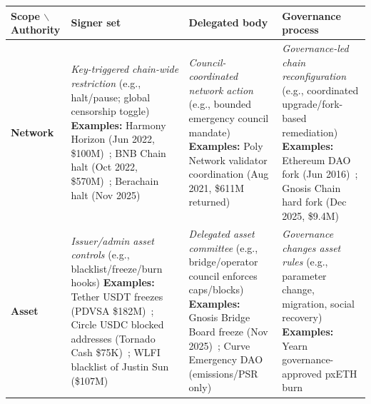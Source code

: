 \documentclass[12pt]{article}
\begin{document}
\begin{table}[!htbp]
\centering
\scriptsize
\setlength{\tabcolsep}{3pt}
\renewcommand{\arraystretch}{1.0}

\begin{tabularx}{\linewidth}{
  >{\raggedright\arraybackslash}p{2.0cm}
  >{\raggedright\arraybackslash}X
  >{\raggedright\arraybackslash}X
  >{\raggedright\arraybackslash}X
}
\toprule
\textbf{Scope $\backslash$ Authority} &
\textbf{Signer set} &
\textbf{Delegated body} &
\textbf{Governance process} \\
\midrule

\textbf{Network}
&
\emph{Key-triggered chain-wide restriction} \newline
(e.g., halt/pause; global censorship toggle) \newline
\textbf{Examples:} Harmony Horizon (Jun 2022, \$100M)~\cite{Harmony2022Exploit}; BNB Chain halt (Oct 2022, \$570M)~\cite{ReutersBNB2022}; Berachain halt (Nov 2025)~\cite{Berachain2025PostMortem}
&
\emph{Council-coordinated network action} \newline
(e.g., bounded emergency council mandate) \newline
\textbf{Examples:} Poly Network validator coordination (Aug 2021, \$611M returned)~\cite{PolyNetworkElliptic}
&
\emph{Governance-led chain reconfiguration} \newline
(e.g., coordinated upgrade/fork-based remediation) \newline
\textbf{Examples:} Ethereum DAO fork (Jun 2016)~\cite{TheDAO2016}; Gnosis Chain hard fork (Dec 2025, \$9.4M)~\cite{Gnosis2025HardFork} \\
\midrule

\textbf{Asset}
&
\emph{Issuer/admin asset controls} \newline
(e.g., blacklist/freeze/burn hooks) \newline
\textbf{Examples:} Tether USDT freezes (PDVSA \$182M)~\cite{TetherVenezuela2026}; Circle USDC blocked addresses (Tornado Cash \$75K)~\cite{CircleUSDCTerms2025}; WLFI blacklist of Justin Sun (\$107M)~\cite{WLFIJustinSun2025}
&
\emph{Delegated asset committee} \newline
(e.g., bridge/operator council enforces caps/blocks) \newline
\textbf{Examples:} Gnosis Bridge Board freeze (Nov 2025)~\cite{Gnosis2025BalancerHack}; Curve Emergency DAO (emissions/PSR only)~\cite{CurveExploitLlamaRisk}
&
\emph{Governance changes asset rules} \newline
(e.g., parameter change, migration, social recovery) \newline
\textbf{Examples:} Yearn governance-approved pxETH burn~\cite{Yearn2025Recovery} \\
\midrule


\end{tabularx}
\end{table}
\end{document}
